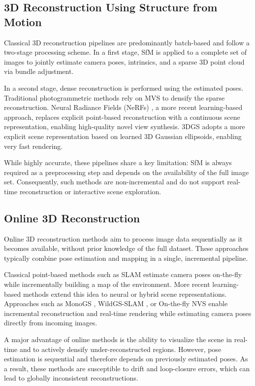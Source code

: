 \documentclass[a4paper,fleqn]{cas-dc}
\begin{document}
\subsection{3D Reconstruction Using Structure from Motion}\label{ssec:related_work:3d_reconstruction_sfm}
Classical 3D reconstruction pipelines are predominantly batch-based and follow a two-stage processing scheme. In a first stage, SfM is applied to a complete set of images to jointly estimate camera poses, intrinsics, and a sparse 3D point cloud via bundle adjustment.

In a second stage, dense reconstruction is performed using the estimated poses. Traditional photogrammetric methods rely on MVS to densify the sparse reconstruction. Neural Radiance Fields (NeRFs) \cite{mildenhall_nerf_2021}, a more recent learning-based approach, replaces explicit point-based reconstruction with a continuous scene representation, enabling high-quality novel view synthesis. 3DGS adopts a more explicit scene representation based on learned 3D Gaussian ellipsoids, enabling very fast rendering.

While highly accurate, these pipelines share a key limitation: SfM is always required as a preprocessing step and depends on the availability of the full image set. Consequently, such methods are non-incremental and do not support real-time reconstruction or interactive scene exploration.

\subsection{Online 3D Reconstruction}\label{ssec:related_work:online_3d_reconstruction}
Online 3D reconstruction methods aim to process image data sequentially as it becomes available, without prior knowledge of the full dataset. These approaches typically combine pose estimation and mapping in a single, incremental pipeline.

Classical point-based methods such as SLAM estimate camera poses on-the-fly while incrementally building a map of the environment. More recent learning-based methods extend this idea to neural or hybrid scene representations. Approaches such as MonoGS \cite{matsuki_gaussian_2024}, WildGS-SLAM \cite{zheng_wildgs-slam_2025}, or On-the-fly NVS \cite{meuleman_--fly_2025} enable incremental reconstruction and real-time rendering while estimating camera poses directly from incoming images.

A major advantage of online methods is the ability to visualize the scene in real-time and to actively densify under-reconstructed regions. However, pose estimation is sequential and therefore depends on previously estimated poses. As a result, these methods are susceptible to drift and loop-closure errors, which can lead to globally inconsistent reconstructions.
\end{document}
